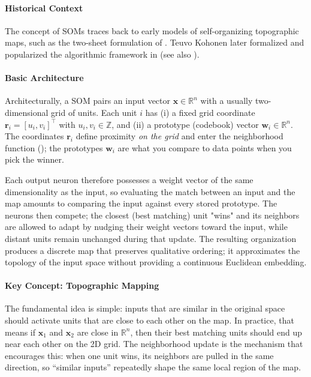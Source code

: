 \paragraph{Historical Context}

The concept of SOMs traces back to early models of self-organizing topographic maps, such as the two-sheet formulation of \citet{WillshawVonDerMalsburg1976}. Teuvo Kohonen later formalized and popularized the algorithmic framework in \citet{Kohonen1982} (see also \citealp{Kohonen2001}).

\paragraph{Basic Architecture}

Architecturally, a SOM pairs an input vector \(\mathbf{x}\in\mathbb{R}^n\) with a usually two-dimensional grid of units. Each unit \(i\) has (i) a fixed grid coordinate \(\mathbf{r}_i=[u_i,v_i]^\top\) with \(u_i,v_i\in\mathbb{Z}\), and (ii) a prototype (codebook) vector \(\mathbf{w}_i\in\mathbb{R}^n\). The coordinates \(\mathbf{r}_i\) define proximity \emph{on the grid} and enter the neighborhood function (); the prototypes \(\mathbf{w}_i\) are what you compare to data points when you pick the winner.

Each output neuron therefore possesses a weight vector of the same dimensionality as the input, so evaluating the match between an input and the map amounts to comparing the input against every stored prototype. The neurons then compete; the closest (best matching) unit "wins" and its neighbors are allowed to adapt by nudging their weight vectors toward the input, while distant units remain unchanged during that update. The resulting organization produces a discrete map that preserves qualitative ordering; it approximates the topology of the input space without providing a continuous Euclidean embedding.

\paragraph{Key Concept: Topographic Mapping}

The fundamental idea is simple: inputs that are similar in the original space should activate units that are close to each other on the map. In practice, that means if \(\mathbf{x}_1\) and \(\mathbf{x}_2\) are close in \(\mathbb{R}^n\), then their best matching units should end up near each other on the 2D grid. The neighborhood update is the mechanism that encourages this: when one unit wins, its neighbors are pulled in the same direction, so ``similar inputs'' repeatedly shape the same local region of the map.

